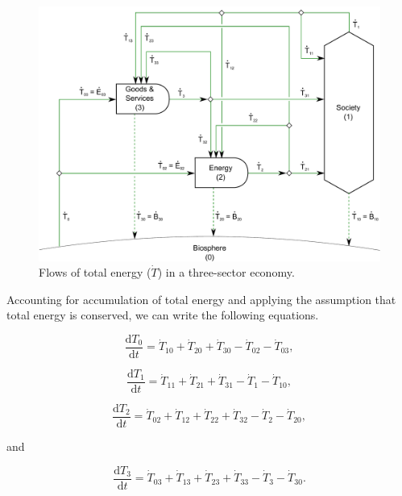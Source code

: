 \begin{figure}[h!]
\includegraphics[width=1.0\linewidth]{Part_2/Chapter_Embodied/images/3_sector_embodied_energy.pdf}
\caption{Flows of total energy ($\dot{T}$) in a three-sector economy.}
\label{fig:C_total_energy}
\end{figure}

Accounting for accumulation of total energy and 
applying the assumption that total energy is conserved, 
we can write the following equations.

\begin{equation} \label{eq:C-CV_T_0}
	\frac{\mathrm{d}T_{0}}{\mathrm{d}t} 	 
	= \dot{T}_{10} 
	+ \dot{T}_{20} 
	+ \dot{T}_{30} 
	- \dot{T}_{02} 
	- \dot{T}_{03},
\end{equation}

\begin{equation} \label{eq:C-CV_T_1}
	\frac{\mathrm{d}T_{1}}{\mathrm{d}t} 	 
	= \dot{T}_{11}
	+ \dot{T}_{21} 
	+ \dot{T}_{31} 
	- \dot{T}_{1}
	- \dot{T}_{10},
\end{equation}

\begin{equation} \label{eq:C-CV_T_2}
	\frac{\mathrm{d}T_{2}}{\mathrm{d}t} 	 
	= \dot{T}_{02} 
	+ \dot{T}_{12}
	+ \dot{T}_{22} 
	+ \dot{T}_{32} 
	- \dot{T}_{2} 
	- \dot{T}_{20},
\end{equation}

\noindent and 

\begin{equation} \label{eq:C-CV_T_3}
	\frac{\mathrm{d}T_{3}}{\mathrm{d}t} 	 
	= \dot{T}_{03} 
	+ \dot{T}_{13}
	+ \dot{T}_{23} 
	+ \dot{T}_{33} 
	- \dot{T}_{3} 
	- \dot{T}_{30}.
\end{equation}

